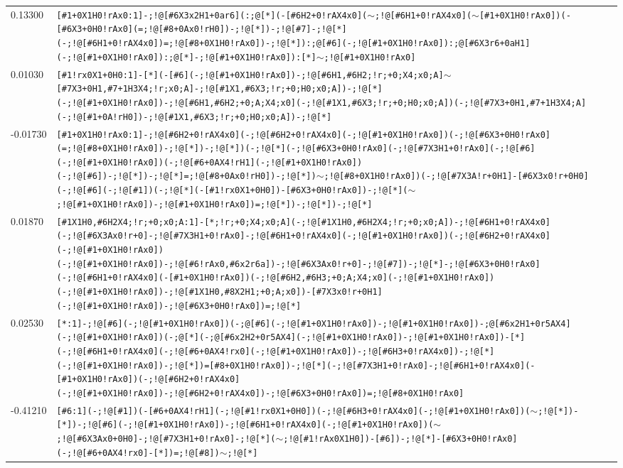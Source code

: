 \begin{longtable}{>{\baselineskip=10pt}p{} >{\baselineskip=10pt}p{}}
0.13300 & \texttt{[\#1+0X1H0!rAx0:1]-;!@[\#6X3x2H1+0ar6](:;@[*](-[\#6H2+0!rAX4x0]($\sim$;!@[\#6H1+0!rAX4x0]($\sim$[\#1+0X1H0!rAx0])(-[\#6X3+0H0!rAx0](=;!@[\#8+0Ax0!rH0])-;!@[*])-;!@[\#7]-;!@[*](-;!@[\#6H1+0!rAX4x0])=;!@[\#8+0X1H0!rAx0])-;!@[*]):;@[\#6](-;!@[\#1+0X1H0!rAx0]):;@[\#6X3r6+0aH1](-;!@[\#1+0X1H0!rAx0]):;@[*]-;!@[\#1+0X1H0!rAx0]):[*]$\sim$;!@[\#1+0X1H0!rAx0]} \\ 
0.01030 & \texttt{[\#1!rx0X1+0H0:1]-[*](-[\#6](-;!@[\#1+0X1H0!rAx0])-;!@[\#6H1,\#6H2;!r;+0;X4;x0;A]$\sim$[\#7X3+0H1,\#7+1H3X4;!r;x0;A]-;!@[\#1X1,\#6X3;!r;+0;H0;x0;A])-;!@[*](-;!@[\#1+0X1H0!rAx0])-;!@[\#6H1,\#6H2;+0;A;X4;x0](-;!@[\#1X1,\#6X3;!r;+0;H0;x0;A])(-;!@[\#7X3+0H1,\#7+1H3X4;A](-;!@[\#1+0A!rH0])-;!@[\#1X1,\#6X3;!r;+0;H0;x0;A])-;!@[*]} \\ 
-0.01730 & \texttt{[\#1+0X1H0!rAx0:1]-;!@[\#6H2+0!rAX4x0](-;!@[\#6H2+0!rAX4x0](-;!@[\#1+0X1H0!rAx0])(-;!@[\#6X3+0H0!rAx0](=;!@[\#8+0X1H0!rAx0])-;!@[*])-;!@[*])(-;!@[*](-;!@[\#6X3+0H0!rAx0](-;!@[\#7X3H1+0!rAx0](-;!@[\#6](-;!@[\#1+0X1H0!rAx0])(-;!@[\#6+0AX4!rH1](-;!@[\#1+0X1H0!rAx0])(-;!@[\#6])-;!@[*])-;!@[*]=;!@[\#8+0Ax0!rH0])-;!@[*])$\sim$;!@[\#8+0X1H0!rAx0])(-;!@[\#7X3A!r+0H1]-[\#6X3x0!r+0H0](-;!@[\#6](-;!@[\#1])(-;!@[*](-[\#1!rx0X1+0H0])-[\#6X3+0H0!rAx0])-;!@[*]($\sim$;!@[\#1+0X1H0!rAx0])-;!@[\#1+0X1H0!rAx0])=;!@[*])-;!@[*])-;!@[*]} \\ 
0.01870 & \texttt{[\#1X1H0,\#6H2X4;!r;+0;x0;A:1]-[*;!r;+0;X4;x0;A](-;!@[\#1X1H0,\#6H2X4;!r;+0;x0;A])-;!@[\#6H1+0!rAX4x0](-;!@[\#6X3Ax0!r+0]-;!@[\#7X3H1+0!rAx0]-;!@[\#6H1+0!rAX4x0](-;!@[\#1+0X1H0!rAx0])(-;!@[\#6H2+0!rAX4x0](-;!@[\#1+0X1H0!rAx0])(-;!@[\#1+0X1H0!rAx0])-;!@[\#6!rAx0,\#6x2r6a])-;!@[\#6X3Ax0!r+0]-;!@[\#7])-;!@[*]-;!@[\#6X3+0H0!rAx0](-;!@[\#6H1+0!rAX4x0](-[\#1+0X1H0!rAx0])(-;!@[\#6H2,\#6H3;+0;A;X4;x0](-;!@[\#1+0X1H0!rAx0])(-;!@[\#1+0X1H0!rAx0])-;!@[\#1X1H0,\#8X2H1;+0;A;x0])-[\#7X3x0!r+0H1](-;!@[\#1+0X1H0!rAx0])-;!@[\#6X3+0H0!rAx0])=;!@[*]} \\ 
0.02530 & \texttt{[*:1]-;!@[\#6](-;!@[\#1+0X1H0!rAx0])(-;@[\#6](-;!@[\#1+0X1H0!rAx0])-;!@[\#1+0X1H0!rAx0])-;@[\#6x2H1+0r5AX4](-;!@[\#1+0X1H0!rAx0])(-;@[*](-;@[\#6x2H2+0r5AX4](-;!@[\#1+0X1H0!rAx0])-;!@[\#1+0X1H0!rAx0])-[*](-;!@[\#6H1+0!rAX4x0](-;!@[\#6+0AX4!rx0](-;!@[\#1+0X1H0!rAx0])-;!@[\#6H3+0!rAX4x0])-;!@[*](-;!@[\#1+0X1H0!rAx0])-;!@[*])=[\#8+0X1H0!rAx0])-;!@[*](-;!@[\#7X3H1+0!rAx0]-;!@[\#6H1+0!rAX4x0](-[\#1+0X1H0!rAx0])(-;!@[\#6H2+0!rAX4x0](-;!@[\#1+0X1H0!rAx0])-;!@[\#6H2+0!rAX4x0])-;!@[\#6X3+0H0!rAx0])=;!@[\#8+0X1H0!rAx0]} \\ 
-0.41210 & \texttt{[\#6:1](-;!@[\#1])(-[\#6+0AX4!rH1](-;!@[\#1!rx0X1+0H0])(-;!@[\#6H3+0!rAX4x0](-;!@[\#1+0X1H0!rAx0])($\sim$;!@[*])-[*])-;!@[\#6](-;!@[\#1+0X1H0!rAx0])-;!@[\#6H1+0!rAX4x0](-;!@[\#1+0X1H0!rAx0])($\sim$;!@[\#6X3Ax0+0H0]-;!@[\#7X3H1+0!rAx0]-;!@[*]($\sim$;!@[\#1!rAx0X1H0])-[\#6])-;!@[*]-[\#6X3+0H0!rAx0](-;!@[\#6+0AX4!rx0]-[*])=;!@[\#8])$\sim$;!@[*]} \\ 

\end{longtable}
